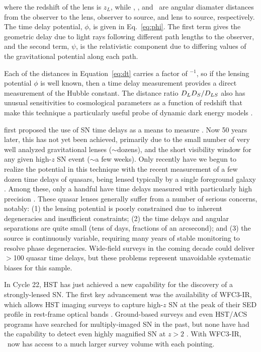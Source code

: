 \noindent where the redshift of the lens is $z_L$, while \Dl, \Ds, 
and \Dls\ are angular diamater distances from the observer to the
lens, observer to source, and lens to source, respectively.  The time
delay potential, $\phi$, is given in Eq.~\ref{eq:phi}. The first term
gives the geometric delay due to light rays following different path
lengths to the observer, and the second term, $\psi$, is the
relativistic component due to differing values of the gravitational
potential along each path.

Each of the distances in Equation~\ref{eq:dt} carries a factor
of \Ho$^{-1}$, so if the lensing potential $\phi$ is well known, then a
time delay measurement provides a direct measurement of the Hubble
constant.  The distance ratio $D_LD_S/D_{LS}$ also has
unusual sensitivities to cosmological parameters as a function of
redshift that make this technique a particularly useful probe of
dynamic dark energy models \citep{Linder:2011}.

\citet{Refsdal:1964} first proposed the use of SN time delays as 
a means to measure \Ho.  Now 50 years later, this has not yet been
achieved, primarily due to the small number of very well analyzed
gravitational lenses ($\sim$dozens), and the short visibility window
for any given high-$z$ SN event ($\sim$a few weeks).  Only recently
have we begun to realize the potential in this technique with the
recent measurement of a few dozen time delays of quasars, being lensed
typically by a single foreground galaxy \citep{Jackson:2007}. Among
these, only a handful have time delays measured with particularly high
precision \citep[e.g.]{Suyu:2010,Suyu:2013}.  These quasar lenses
generally suffer from a number of serious concerns, notably: (1) the
lensing potential is poorly constrained due to inherent degeneracies
and insufficient constraints; (2) the time delays and angular
separations are quite small (tens of days, fractions of an arcsecond);
and (3) the source is continuously variable, requiring many years of
stable monitoring to resolve phase degeneracies.  Wide-field surveys
in the coming decade could deliver $>$100 quasar time delays, but
these problems represent unavoidable systematic biases for this
sample.


\medskip
{}
 
In Cycle 22, HST has just achieved a new capability for the discovery
of a strongly-lensed SN. The first key advancement was the
availability of WFC3-IR, which allows HST imaging surveys to capture
high-$z$ SN at the peak of their SED profile in rest-frame optical
bands \citep{Rodney:2012,Jones:2013}.  Ground-based surveys and even
HST/ACS programs have searched for multiply-imaged SN in the past, but
none have had the capability to detect even highly magnified SN at
$z>2$ \citep[e.g.][]{Dawson:2009,Sand:2011}.  With WFC3-IR, \Hubble\
now has access to a much larger survey volume with each pointing.

